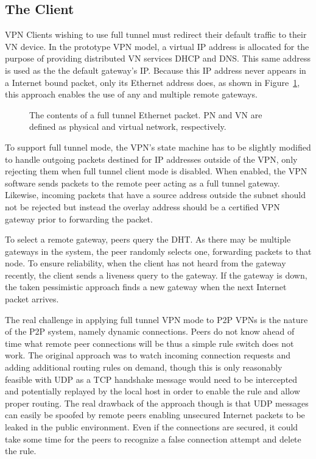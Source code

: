\subsection{The Client}
VPN Clients wishing to use full tunnel must redirect their default traffic to
their VN device.  In the prototype VPN model, a virtual IP address is allocated
for the purpose of providing distributed VN services DHCP and DNS.  This same
address is used as the the default gateway's IP.  Because this IP address never
appears in a Internet bound packet, only its Ethernet address does, as shown in
Figure~\ref{fig:tunnel_packet}, this approach enables the use of any and
multiple remote gateways.

\begin{figure}
\centering
{}
\caption[The contents of a full tunnel Ethernet packet]{The contents of a full
tunnel Ethernet packet.  PN and VN are defined as physical and virtual network,
respectively.}
\label{fig:tunnel_packet}
\end{figure}

To support full tunnel mode, the VPN's state machine has to be slightly modified
to handle outgoing packets destined for IP addresses outside of the VPN, only
rejecting them when full tunnel client mode is disabled.  When enabled, the VPN
software sends packets to the remote peer acting as a full tunnel gateway.
Likewise, incoming packets that have a source address outside the subnet should
not be rejected but instead the overlay address should be a certified VPN
gateway prior to forwarding the packet.

To select a remote gateway, peers query the DHT.  As there may be multiple
gateways in the system, the peer randomly selects one, forwarding packets to
that node.  To ensure reliability, when the client has not heard from the
gateway recently, the client sends a liveness query to the gateway.  If the
gateway is down, the taken pessimistic approach finds a new gateway when
the next Internet packet arrives.

The real challenge in applying full tunnel VPN mode to P2P VPNs is the nature
of the P2P system, namely dynamic connections.  Peers do not know ahead of time
what remote peer connections will be thus a simple rule switch does not work.
The original approach was to watch incoming connection requests and adding
additional routing rules on demand, though this is only reasonably feasible
with UDP as a TCP handshake message would need to be intercepted and potentially
replayed by the local host in order to enable the rule and allow proper routing.
The real drawback of the approach though is that UDP messages can easily be
spoofed by remote peers enabling unsecured Internet packets to be leaked in the
public environment.  Even if the connections are secured, it could take some
time for the peers to recognize a false connection attempt and delete the rule.

